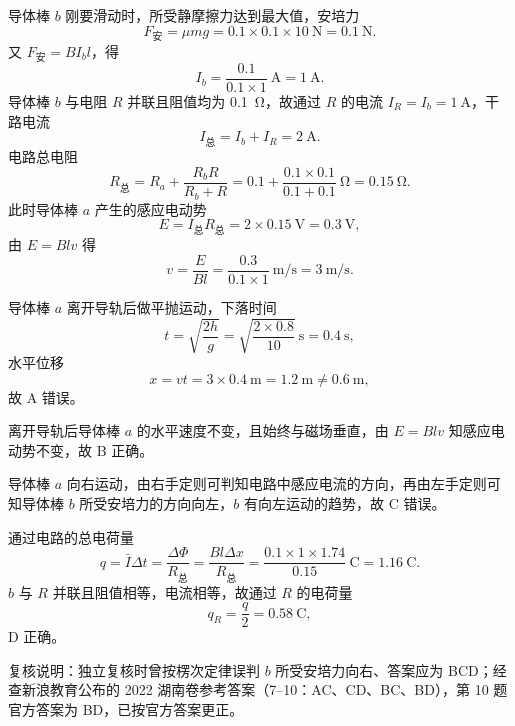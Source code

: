 \begin{answer}
导体棒 $b$ 刚要滑动时，所受静摩擦力达到最大值，安培力
\[
  F_{\text{安}}=\mu mg=0.1\times0.1\times10~\si{\newton}=\SI{0.1}{\newton}.
\]
又 $F_{\text{安}}=BI_{b}l$，得
\[
  I_{b}=\frac{0.1}{0.1\times1}~\si{\ampere}=\SI{1}{\ampere}.
\]
导体棒 $b$ 与电阻 $R$ 并联且阻值均为 \SI{0.1}{\ohm}，故通过 $R$ 的电流 $I_{R}=I_{b}=\SI{1}{\ampere}$，干路电流
\[
  I_{\text{总}}=I_{b}+I_{R}=\SI{2}{\ampere}.
\]
电路总电阻
\[
  R_{\text{总}}=R_{a}+\frac{R_{b}R}{R_{b}+R}
  =0.1+\frac{0.1\times0.1}{0.1+0.1}~\si{\ohm}
  =\SI{0.15}{\ohm}.
\]
此时导体棒 $a$ 产生的感应电动势
\[
  E=I_{\text{总}}R_{\text{总}}=2\times0.15~\si{\volt}=\SI{0.3}{\volt},
\]
由 $E=Blv$ 得
\[
  v=\frac{E}{Bl}=\frac{0.3}{0.1\times1}~\si{\metre\per\second}=\SI{3}{\metre\per\second}.
\]

导体棒 $a$ 离开导轨后做平抛运动，下落时间
\[
  t=\sqrt{\frac{2h}{g}}=\sqrt{\frac{2\times0.8}{10}}~\si{\second}=\SI{0.4}{\second},
\]
水平位移
\[
  x=vt=3\times0.4~\si{\metre}=\SI{1.2}{\metre}\neq\SI{0.6}{\metre},
\]
故 A 错误。

离开导轨后导体棒 $a$ 的水平速度不变，且始终与磁场垂直，由 $E=Blv$ 知感应电动势不变，故 B 正确。

导体棒 $a$ 向右运动，由右手定则可判知电路中感应电流的方向，再由左手定则可知导体棒 $b$ 所受安培力的方向向左，$b$ 有向左运动的趋势，故 C 错误。

通过电路的总电荷量
\[
  q=\bar{I}\Delta t=\frac{\Delta\Phi}{R_{\text{总}}}
  =\frac{Bl\Delta x}{R_{\text{总}}}
  =\frac{0.1\times1\times1.74}{0.15}~\si{\coulomb}
  =\SI{1.16}{\coulomb}.
\]
$b$ 与 $R$ 并联且阻值相等，电流相等，故通过 $R$ 的电荷量
\[
  q_{R}=\frac{q}{2}=\SI{0.58}{\coulomb},
\]
D 正确。

\begin{gktip}
复核说明：独立复核时曾按楞次定律误判 $b$ 所受安培力向右、答案应为 BCD；经查新浪教育公布的 2022 湖南卷参考答案（7--10：AC、CD、BC、BD），第 10 题官方答案为 BD，已按官方答案更正。
\end{gktip}
\end{answer}

